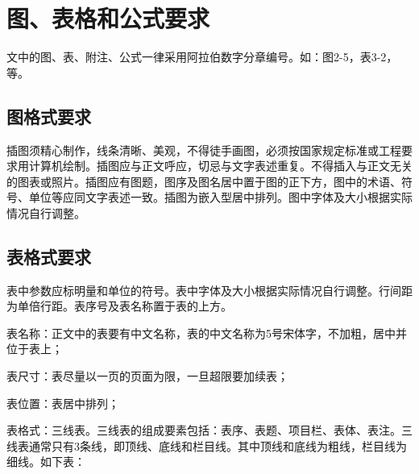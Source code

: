 	\section{图、表格和公式要求}
	
	文中的图、表、附注、公式一律采用阿拉伯数字分章编号。如：图2-5，表3-2，等。
	
	\subsection{图格式要求}
	
	插图须精心制作，线条清晰、美观，不得徒手画图，必须按国家规定标准或工程要求用计算机绘制。插图应与正文呼应，切忌与文字表述重复。不得插入与正文无关的图表或照片。插图应有图题，图序及图名居中置于图的正下方，图中的术语、符号、单位等应同文字表述一致。插图为嵌入型居中排列。图中字体及大小根据实际情况自行调整。
	
	\begin{figure}[h]
		\centering
		\hspace{30pt}
		\label{tab:fig1} %
	\end{figure}
	
	\subsection{表格式要求}
	
	表中参数应标明量和单位的符号。表中字体及大小根据实际情况自行调整。行间距为单倍行距。表序号及表名称置于表的上方。
	
	表名称：正文中的表要有中文名称，表的中文名称为5号宋体字，不加粗，居中并位于表上；
	
	表尺寸：表尽量以一页的页面为限，一旦超限要加续表；
	
	表位置：表居中排列；
	
	表格式：三线表。三线表的组成要素包括：表序、表题、项目栏、表体、表注。三线表通常只有3条线，即顶线、底线和栏目线。其中顶线和底线为粗线，栏目线为细线。如下表：
	
